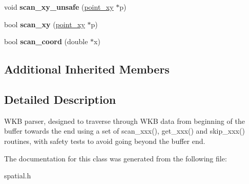 \begin{DoxyCompactItemize}
\item 
\mbox{\label{classGeometry_1_1wkb__parser_a5fb9e16f80dbca352fccd01090ab9ad2}} 
void {\bfseries scan\+\_\+xy\+\_\+unsafe} (\mbox{\hyperlink{classpoint__xy}{point\+\_\+xy}} $\ast$p)
\item 
\mbox{\label{classGeometry_1_1wkb__parser_a8fa9c191862078cace7d0ac4bc1b2c65}} 
bool {\bfseries scan\+\_\+xy} (\mbox{\hyperlink{classpoint__xy}{point\+\_\+xy}} $\ast$p)
\item 
\mbox{\label{classGeometry_1_1wkb__parser_aa4602ae209a369b241aa09a3c0eef690}} 
bool {\bfseries scan\+\_\+coord} (double $\ast$x)
\end{DoxyCompactItemize}
\subsection*{Additional Inherited Members}


\subsection{Detailed Description}
W\+KB parser, designed to traverse through W\+KB data from beginning of the buffer towards the end using a set of scan\+\_\+xxx(), get\+\_\+xxx() and skip\+\_\+xxx() routines, with safety tests to avoid going beyond the buffer end. 

The documentation for this class was generated from the following file\+:\begin{DoxyCompactItemize}
\item 
spatial.\+h\end{DoxyCompactItemize}
